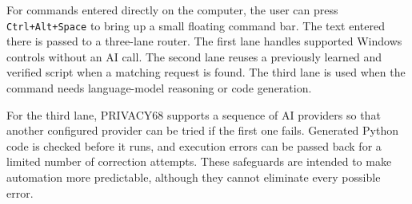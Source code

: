 \documentclass[12pt,letterpaper,oneside]{report}
\begin{document}
For commands entered directly on the computer, the user can press \texttt{Ctrl+Alt+Space} to bring up a small floating command bar. The text entered there is passed to a three-lane router. The first lane handles supported Windows controls without an AI call. The second lane reuses a previously learned and verified script when a matching request is found. The third lane is used when the command needs language-model reasoning or code generation.

For the third lane, PRIVACY68 supports a sequence of AI providers so that another configured provider can be tried if the first one fails. Generated Python code is checked before it runs, and execution errors can be passed back for a limited number of correction attempts. These safeguards are intended to make automation more predictable, although they cannot eliminate every possible error.
\end{document}
